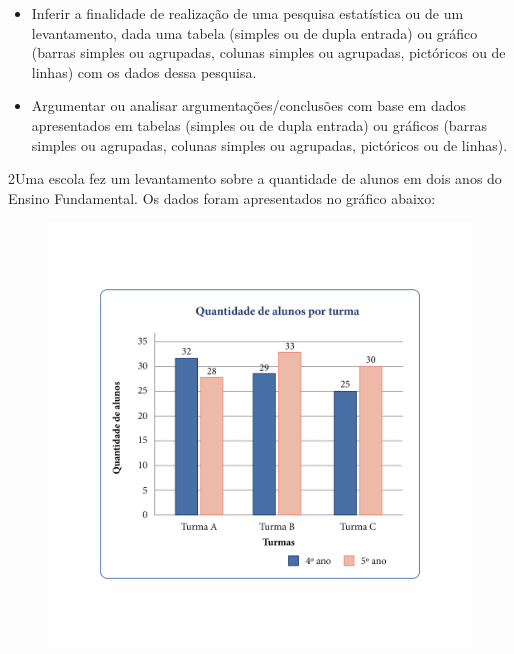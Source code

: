 
\begin{itemize}
\item Inferir a finalidade de realização de uma pesquisa estatística ou de
um levantamento, dada uma tabela (simples ou de dupla entrada) ou
gráfico (barras simples ou agrupadas, colunas simples ou agrupadas,
pictóricos ou de linhas) com os dados dessa pesquisa.

\item Argumentar ou analisar argumentações/conclusões com base em dados
apresentados em tabelas (simples ou de dupla entrada) ou gráficos
(barras simples ou agrupadas, colunas simples ou agrupadas, pictóricos
ou de linhas).
\end{itemize}


\num{2}Uma escola fez um levantamento sobre a quantidade de alunos em dois
anos do Ensino Fundamental. Os dados foram apresentados no gráfico
abaixo:

\begin{figure}[htpb!]
\includegraphics[width=\textwidth]{../ilustracoes/MAT5/SAEB_5ANO_MAT_figura110.png}
\end{figure}

